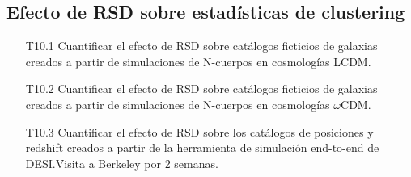 \subsection*{Efecto de RSD sobre estad\'isticas de clustering}
\begin{itemize}
\item[T10.1] \gradB
  Cuantificar el efecto de RSD sobre cat\'alogos ficticios de
  galaxias creados a partir de simulaciones de N-cuerpos en
  cosmolog\'ias LCDM. 
\item[T10.2] \gradB Cuantificar el efecto de RSD sobre cat\'alogos ficticios de
  galaxias creados a partir de simulaciones de N-cuerpos en
  cosmolog\'ias $\omega$CDM. 
\item[T10.3] \gradB Cuantificar el efecto de RSD sobre los cat\'alogos de
  posiciones y redshift creados a partir de la herramienta de
  simulaci\'on end-to-end de DESI.\bob Visita a Berkeley por 2 semanas.
\end{itemize}


